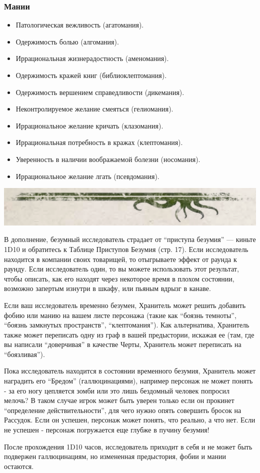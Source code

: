 \documentclass[letterpaper,twocolumn,openany, twoside, 11pt, usenames]{cocbook}
\begin{document}
\begin{fullcocpaperbox}{}{}
\begin{multicols}{2}
  \subsubsection*{Мании}
  \begin{itemize}[leftmargin=4mm]
  \item Патологическая вежливость (агатомания).
  \item Одержимость болью (алгомания).
  \item Иррациональная жизнерадостность (аменомания).
  \item Одержимость кражей книг (библиоклептомания).
  \item Одержимость вершением справедливости (дикемания).
  \item Неконтролируемое желание смеяться (гелиомания).
  \item Иррациональное желание кричать (клазомания).
  \item Иррациональная потребность в кражах (клептомания).
  \item Уверенность в наличии воображаемой болезни (носомания).
  \item Иррациональное желание лгать (псевдомания).
\end{itemize}
  \end{multicols}
  \includegraphics[width=\linewidth]{img/bottom.png}
\end{fullcocpaperbox}
В дополнение, безумный исследователь страдает от ``приступа безумия'' --- киньте 1D10 и обратитесь к Таблице Приступов Безумия (стр. 17). Если исследователь находится в компании своих товарищей, то отыгрываете эффект от раунда к раунду. Если исследователь один, то вы можете использовать этот результат, чтобы описать, как его находят через некоторое время в плохом состоянии, возможно запертым изнутри в шкафу, или пьяным вдрызг в канаве.

Если ваш исследователь временно безумен, Хранитель может решить добавить фобию или манию на вашем листе персонажа (такие как ``боязнь темноты'', ``боязнь замкнутых пространств'', ``клептомания''). Как альтернатива, Хранитель также может переписать одну из граф в вашей предыстории, искажая ее (там, где вы написали ``доверчивая'' в качестве Черты, Хранитель может переписать на ``боязливая'').

Пока исследователь находится в состоянии временного безумия, Хранитель может наградить его ``Бредом'' (галлюцинациями), например персонаж не может понять - за его ногу цепляется зомби или это лишь бездомный человек попросил мелочь? В таком случае игрок может быть уверен только если он прокинет ``определение действительности'', для чего нужно опять совершить бросок на Рассудок. Если он успешен, персонаж может понять, что реально, а что нет. Если не успешен - персонаж погружается еще глубже в пучину безумия!

После прохождения 1D10 часов, исследователь приходит в себя и не может быть подвержен галлюцинациям, но измененная предыстория, фобии и мании остаются.
\end{document}
